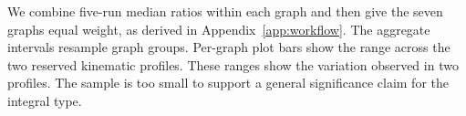 We combine five-run median ratios within each graph and then give the
seven graphs equal weight, as derived in Appendix~\ref{app:workflow}.
The aggregate intervals resample graph groups. Per-graph plot bars show
the range across the two reserved kinematic profiles. These ranges show the variation observed in two profiles. The sample is too small to support a general significance claim for the integral type.
